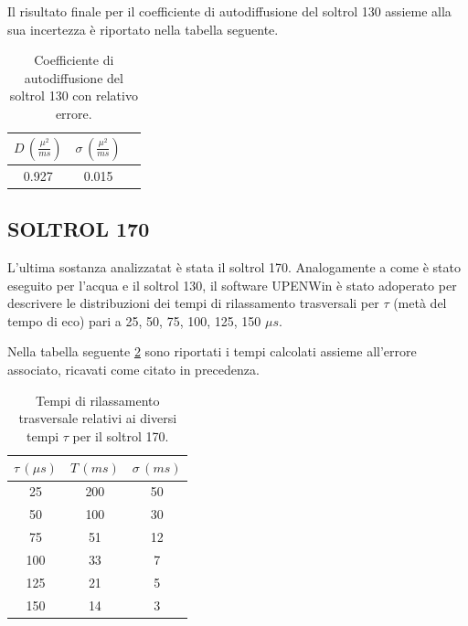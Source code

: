 Il risultato finale per il coefficiente di autodiffusione del soltrol 130 assieme alla sua incertezza è riportato nella tabella seguente.

\begin{table}[h!]
    \begin{center}
    \begin{tabular}{c c c}
    \toprule
    	$D\,(\frac{{\mu}^2}{ms})$ & $\sigma\,(\frac{{\mu}^2}{ms})$ \\
    \midrule
    	0.927	&	0.015	\\
    \bottomrule
    \end{tabular}
    \caption{Coefficiente di autodiffusione del soltrol 130 con relativo errore.}
    \label{tab:Df_s130}
    \end{center}
\end{table}


\subsection*{SOLTROL 170}

L'ultima sostanza analizzatat è stata il soltrol 170.
Analogamente a come è stato eseguito per l'acqua e il soltrol 130, il software UPENWin è stato adoperato per descrivere le distribuzioni dei tempi di rilassamento trasversali per $\tau$ (metà del tempo di eco) pari a 25, 50, 75, 100, 125, 150 ${\mu}s$.

Nella tabella seguente \ref{tab:T_s170} sono riportati i tempi calcolati assieme all'errore associato, ricavati come citato in precedenza.

\begin{table}[h!]
    \begin{center}
    \begin{tabular}{c c c}
    \toprule
    	${\tau}\,({\mu}s)$ & $T\,(ms)$ & ${\sigma}\,(ms)$ \\
    \midrule
	 25 & 200 & 50 \\
	 50 & 100 & 30 \\
	 75 & 51 & 12 \\
	 100 & 33 & 7 \\
	 125 & 21 & 5 \\
	 150 & 14 & 3 \\
    \bottomrule
    \end{tabular}
    \caption{Tempi di rilassamento trasversale relativi ai diversi tempi $\tau$ per il soltrol 170.}
    \label{tab:T_s170}
    \end{center}
\end{table}

